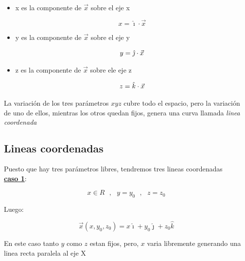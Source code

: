 \documentclass[12pt]{report}
\begin{document}
\begin{itemize}
\item x es la componente de $\vec{x}$ sobre el eje x 

\begin{equation}
\nonumber
x=\hat{\imath}\cdot \vec{x}
\end{equation}

\item y es la componente de $\vec{x}$ sobre el eje y

\begin{equation}{\nonumber}
y=\hat{\jmath}\cdot \vec{x}
\end{equation}

\item z es la componente de $\vec{x}$ sobre ele eje z

\begin{equation}{\nonumber}
z=\hat{k}\cdot \vec{x}
\end{equation}
\end{itemize}

La variación de los tres parámetros $xyz$ cubre todo el espacio, pero la variación de uno de ellos, mientras los otros quedan fijos, genera una curva llamada \textit{linea coordenada}

\subsection{Lineas coordenadas}


Puesto que hay tres parámetros libres, tendremos tres lineas coordenadas \\ 

\underline{\textbf{caso 1}}:

\begin{equation} \nonumber
x \in R \ \ \ ,\ \ \ y= y_0 \ \ \ ,  \ \ \ z=z_0
\end{equation}

Luego:

\begin{equation} \nonumber
\vec{x}(x,y_0,z_0)= x\hat{\imath} + y_0 \hat{\jmath} + z_0 \hat{k}
\end{equation}

En este caso tanto $y$ como $z$ estan fijos, pero, $x$ varia libremente generando una linea recta paralela al eje X  
\end{document}
